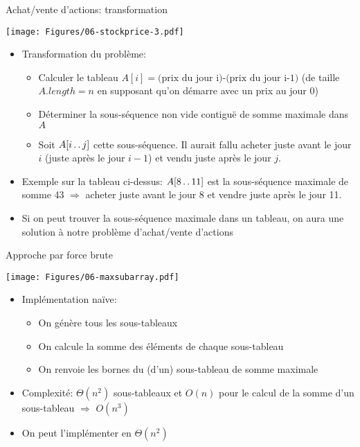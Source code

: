 \begin{frame}{Achat/vente d'actions: transformation}

\centerline{\texttt{[image: Figures/06-stockprice-3.pdf]}}

\bigskip

\begin{itemize}
\item Transformation du problème:
\begin{itemize}
\item Calculer le tableau $A[i]=\mbox{(prix du jour i)-(prix du jour i-1)}$ (de taille $A.length=n$ en supposant qu'on démarre avec un prix au jour 0)
\item Déterminer la sous-séquence  non vide contiguë de somme maximale dans $A$
\item Soit $A[i\mathinner{\ldotp\ldotp} j]$ cette sous-séquence. Il aurait fallu acheter juste avant le jour $i$ (juste après le jour $i-1$) et vendu juste après le jour $j$.
\end{itemize}
\item Exemple sur la tableau ci-dessus: $A[8\mathinner{\ldotp\ldotp} 11]$ est la sous-séquence maximale de somme 43 $\Rightarrow$ acheter juste avant le jour 8 et vendre juste après le jour 11.
\item Si on peut trouver la sous-séquence maximale dans un tableau, on aura une solution à notre problème d'achat/vente d'actions
\end{itemize}
\end{frame}

\begin{frame}{Approche par force brute}
\centerline{\texttt{[image: Figures/06-maxsubarray.pdf]}}

\bigskip

\begin{itemize}
\item Implémentation naïve:
\begin{itemize}
\item On génère tous les sous-tableaux 
\item On calcule la somme des éléments de chaque sous-tableau
\item On renvoie les bornes du (d'un) sous-tableau de somme maximale
\end{itemize}
\item Complexité: $\Theta(n^2)$ sous-tableaux et $O(n)$ pour le calcul
  de la somme d'un sous-tableau $\Rightarrow$ $O(n^3)$
\item On peut l'implémenter en $\Theta(n^2)$
\end{itemize}

\end{frame}

